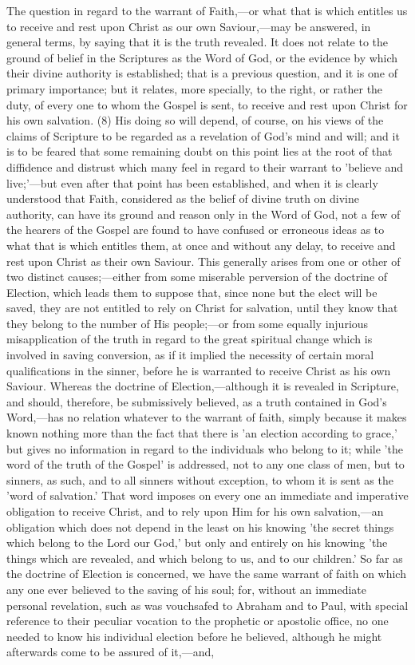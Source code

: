 \documentclass[
]{book}
\begin{document}
The question in regard to the warrant of Faith,---or what that is which entitles us to receive and rest upon Christ as our own Saviour,---may be answered, in general terms, by saying that it is the truth revealed. It does not relate to the ground of belief in the Scriptures as the Word of God, or the evidence by which their divine authority is established; that is a previous question, and it is one of primary importance; but it relates, more specially, to the right, or rather the duty, of every one to whom the Gospel is sent, to receive and rest upon Christ for his own salvation. (8) His doing so will depend, of course, on his views of the claims of Scripture to be regarded as a revelation of God's mind and will; and it is to be feared that some remaining doubt on this point lies at the root of that diffidence and distrust which many feel in regard to their warrant to 'believe and live;'---but even after that point has been established, and when it is clearly understood that Faith, considered as the belief of divine truth on divine authority, can have its ground and reason only in the Word of God, not a few of the hearers of the Gospel are found to have confused or erroneous ideas as to what that is which entitles them, at once and without any delay, to receive and rest upon Christ as their own Saviour. This generally arises from one or other of two distinct causes;---either from some miserable perversion of the doctrine of Election, which leads them to suppose that, since none but the elect will be saved, they are not entitled to rely on Christ for salvation, until they know that they belong to the number of His people;---or from some equally injurious misapplication of the truth in regard to the great spiritual change which is involved in saving conversion, as if it implied the necessity of certain moral qualifications in the sinner, before he is warranted to receive Christ as his own Saviour. Whereas the doctrine of Election,---although it is revealed in Scripture, and should, therefore, be submissively believed, as a truth contained in God's Word,---has no relation whatever to the warrant of faith, simply because it makes known nothing more than the fact that there is 'an election according to grace,' but gives no information in regard to the individuals who belong to it; while 'the word of the truth of the Gospel' is addressed, not to any one class of men, but to sinners, as such, and to all sinners without exception, to whom it is sent as the 'word of salvation.' That word imposes on every one an immediate and imperative obligation to receive Christ, and to rely upon Him for his own salvation,---an obligation which does not depend in the least on his knowing 'the secret things which belong to the Lord our God,' but only and entirely on his knowing 'the things which are revealed, and which belong to us, and to our children.' So far as the doctrine of Election is concerned, we have the same warrant of faith on which any one ever believed to the saving of his soul; for, without an immediate personal revelation, such as was vouchsafed to Abraham and to Paul, with special reference to their peculiar vocation to the prophetic or apostolic office, no one needed to know his individual election before he believed, although he might afterwards come to be assured of it,---and, 
\end{document}
